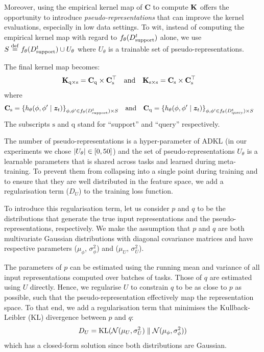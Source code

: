\documentclass[11pt]{article}
\numberwithin{equation}{subsection}
\begin{document}
Moreover, using the empirical kernel map of $\mathbf{C}$ to compute $\mathbf{K}$ offers the opportunity to introduce \textit{pseudo-representations} that can improve the kernel evaluations, especially in low data settings.
To wit, instead of computing the empirical kernel map with regard to $f_\theta({D_{\mathrm{support}}^t})$ alone, we use $S \stackrel{\mathrm{def}}{=} f_\theta({D_{\mathrm{support}}^t}) \cup U_\theta$ where $U_\theta$ is a trainable set of pseudo-representations.

The final kernel map becomes:
\begin{align}
  \mathbf{K}_{\mathrm{q} \times \mathrm{s}} &= \mathbf{C}_\mathrm{q} \times \mathbf{C}_\mathrm{s}^\top & \text{and} && \mathbf{K}_{\mathrm{s} \times \mathrm{s}} &= \mathbf{C}_\mathrm{s} \times \mathbf{C}_\mathrm{s}^\top
\end{align}
where
\begin{align*}
  \mathbf{C}_\mathrm{s} &= \left\{ h_\theta(\phi, \phi' \mid {\bm{z}}_t) \right\}_{\phi, \phi' \in f_\theta({D_{\mathrm{support}}^t}) \times S} & \text{and} && \mathbf{C}_\mathrm{q} &= \left\{ h_\theta(\phi, \phi' \mid {\bm{z}}_t) \right\}_{\phi, \phi' \in f_\theta({D_{\mathrm{query}}^t}) \times S}
\end{align*}
The subscripts $\mathrm{s}$ and $\mathrm{q}$ stand for ``support'' and ``query'' respectively.

The number of pseudo-representations is  a hyper-parameter of ADKL (in our experiments we chose $|U_\theta| \in \left[ 0, 50 \right] $) and the set of pseudo-representations $U_\theta$ is a learnable parameters that is shared across tasks and learned during meta-training.
To prevent them from collapsing into a single point during training and to ensure that they are well distributed in the feature space, we add a regularisation term ($D_U$) to the training loss function.

To introduce this regularisation term, let us consider $p$ and $q$ to be the distributions that generate the true input representations and the pseudo-representations, respectively.
We make the assumption that $p$ and $q$ are both multivariate Gaussian distributions with diagonal covariance matrices and have respective parameters ($\mu_{\phi}$, $\sigma_{\phi}^2$) and ($\mu_{U}$, $\sigma_{U}^2$).

The parameters of $p$ can be estimated using the running mean and variance of all input representations computed over batches of tasks.
Those of $q$ are estimated using $U$ directly.
Hence, we regularise $U$ to constrain $q$ to be as close to $p$ as possible, such that the pseudo-representation effectively map the representation space. To that end, we add a regularisation term that minimises the Kullback-Leibler (KL) divergence between $p$ and $q$:
\begin{equation}
    D_U = \mathrm{KL}({\mathcal{N}}(\mu_U, \sigma_U^2) \parallel {\mathcal{N}}(\mu_{\phi}, \sigma_{\phi}^2))
\end{equation}
which has a closed-form solution since both distributions are Gaussian.
\end{document}

